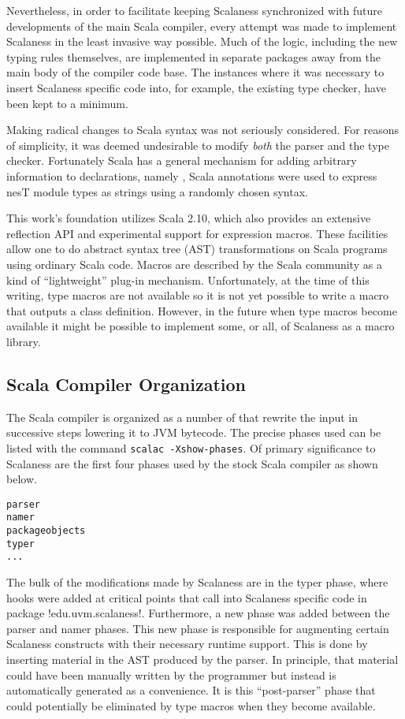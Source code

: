 Nevertheless, in order to facilitate keeping Scalaness synchronized with future developments of
the main Scala compiler, every attempt was made to implement Scalaness in the least invasive way
possible. Much of the logic, including the new typing rules themselves, are implemented in
separate packages away from the main body of the compiler code base. The instances where it was
necessary to insert Scalaness specific code into, for example, the existing type checker, have
been kept to a minimum.

Making radical changes to Scala syntax was not seriously considered. For reasons of simplicity,
it was deemed undesirable to modify \emph{both} the parser and the type checker. Fortunately
Scala has a general mechanism for adding arbitrary information to declarations, namely
, Scala annotations were used to express nesT module types as strings using
a randomly chosen syntax.

This work's foundation utilizes Scala 2.10, which also provides an extensive reflection API
and experimental support for expression macros. These facilities allow one to do abstract syntax
tree (AST) transformations on Scala programs using ordinary Scala code. Macros are described by
the Scala community as a kind of ``lightweight'' plug-in mechanism. Unfortunately, at the time of
this writing, type macros are not available so it is not yet possible to write a macro that
outputs a class definition. However, in the future when type macros become available it might be
possible to implement some, or all, of Scalaness as a macro library.

\subsection{Scala Compiler Organization}
\label{section-scala-compiler-organization}

The Scala compiler is organized as a number of  that rewrite the input in
successive steps lowering it to JVM bytecode. The precise phases used can be listed with the
command \texttt{scalac -Xshow-phases}. Of primary significance to Scalaness are the first four
phases used by the stock Scala compiler as shown below.

\singlespace
\begin{Verbatim}
parser
namer
packageobjects
typer
...
\end{Verbatim}
\primaryspacing

The bulk of the modifications made by Scalaness are in the typer phase, where hooks were added
at critical points that call into Scalaness specific code in package !edu.uvm.scalaness!. Furthermore, 
a new phase was added between the parser and namer phases. This new phase is
responsible for augmenting certain Scalaness constructs with their necessary runtime support.
This is done by inserting material in the AST produced by the parser. In principle, that material
could have been manually written by the programmer but instead is automatically generated as a
convenience. It is this ``post-parser'' phase that could potentially be eliminated by type
macros when they become available.

